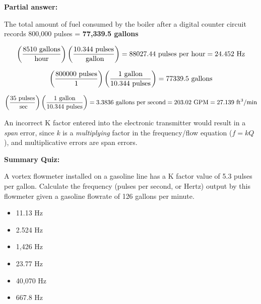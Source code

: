 





\noindent
{\bf Partial answer:}

\vskip 10pt

The total amount of fuel consumed by the boiler after a digital counter circuit records 800,000 pulses = {\bf 77,339.5 gallons} 







$$\left({8510 \hbox{ gallons} \over \hbox{hour}} \right) \left( {10.344 \hbox{ pulses} \over \hbox{ gallon}} \right) = 88027.44 \hbox{ pulses per hour} = 24.452 \hbox{ Hz}$$

\vskip 10pt

$$\left({800000 \hbox{ pulses} \over 1} \right) \left({ 1 \hbox{ gallon} \over 10.344 \hbox{ pulses}} \right) = 77339.5 \hbox{ gallons}$$

\vskip 10pt

$$\left({35 \hbox{ pulses} \over \hbox{ sec}} \right) \left({ 1 \hbox{ gallon} \over 10.344 \hbox{ pulses}} \right) = 3.3836 \hbox{ gallons per second} = 203.02 \hbox{ GPM} = 27.139 \hbox{ ft}^3\hbox{/min}$$

\vskip 10pt

An incorrect K factor entered into the electronic transmitter would result in a {\it span} error, since $k$ is a {\it multiplying} factor in the frequency/flow equation ($f = kQ$), and multiplicative errors are span errors.







\vfil \eject

\noindent
{\bf Summary Quiz:}

A vortex flowmeter installed on a gasoline line has a K factor value of 5.3 pulses per gallon.  Calculate the frequency (pulses per second, or Hertz) output by this flowmeter given a gasoline flowrate of 126 gallons per minute.

\begin{itemize}
\item{} 11.13 Hz
\vskip 5pt 
\item{} 2.524 Hz
\vskip 5pt 
\item{} 1,426 Hz
\vskip 5pt 
\item{} 23.77 Hz
\vskip 5pt 
\item{} 40,070 Hz
\vskip 5pt 
\item{} 667.8 Hz
\end{itemize}




